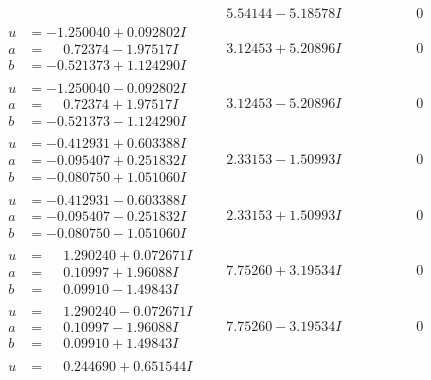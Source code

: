 \documentclass[1p]{elsarticle_modified}
\theoremstyle{definition}
\begin{document}
$$\begin{array}{c|c|c}
 & \phantom{-}5.54144 - 5.18578 I & \phantom{-0.000000 } 0 \\ \hline\begin{aligned}
u &= -1.250040 + 0.092802 I \\
a &= \phantom{-}0.72374 - 1.97517 I \\
b &= -0.521373 + 1.124290 I\end{aligned}
 & \phantom{-}3.12453 + 5.20896 I & \phantom{-0.000000 } 0 \\ \hline\begin{aligned}
u &= -1.250040 - 0.092802 I \\
a &= \phantom{-}0.72374 + 1.97517 I \\
b &= -0.521373 - 1.124290 I\end{aligned}
 & \phantom{-}3.12453 - 5.20896 I & \phantom{-0.000000 } 0 \\ \hline\begin{aligned}
u &= -0.412931 + 0.603388 I \\
a &= -0.095407 + 0.251832 I \\
b &= -0.080750 + 1.051060 I\end{aligned}
 & \phantom{-}2.33153 - 1.50993 I & \phantom{-0.000000 } 0 \\ \hline\begin{aligned}
u &= -0.412931 - 0.603388 I \\
a &= -0.095407 - 0.251832 I \\
b &= -0.080750 - 1.051060 I\end{aligned}
 & \phantom{-}2.33153 + 1.50993 I & \phantom{-0.000000 } 0 \\ \hline\begin{aligned}
u &= \phantom{-}1.290240 + 0.072671 I \\
a &= \phantom{-}0.10997 + 1.96088 I \\
b &= \phantom{-}0.09910 - 1.49843 I\end{aligned}
 & \phantom{-}7.75260 + 3.19534 I & \phantom{-0.000000 } 0 \\ \hline\begin{aligned}
u &= \phantom{-}1.290240 - 0.072671 I \\
a &= \phantom{-}0.10997 - 1.96088 I \\
b &= \phantom{-}0.09910 + 1.49843 I\end{aligned}
 & \phantom{-}7.75260 - 3.19534 I & \phantom{-0.000000 } 0 \\ \hline\begin{aligned}
u &= \phantom{-}0.244690 + 0.651544 I \\

\end{aligned}
\end{array}$$
\end{document}
